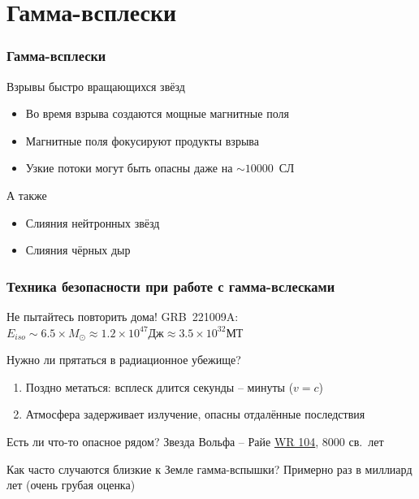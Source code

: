 \documentclass[aspectratio=169]{beamer}
\begin{document}
\section{Гамма-всплески}
\begin{frame}
\frametitle{Гамма-всплески}
\begin{block}{Взрывы быстро вращающихся звёзд}
\begin{itemize}
\item Во время взрыва создаются мощные магнитные поля
\item Магнитные поля фокусируют продукты взрыва
\item Узкие потоки могут быть опасны даже на $\sim 10000$~СЛ
\end{itemize}
\end{block}
\begin{block}{А также}
\begin{itemize}
\item Слияния нейтронных звёзд
\item Слияния чёрных дыр
\end{itemize}
\end{block}
\end{frame}


\begin{frame}
\frametitle{Техника безопасности при работе с гамма-вслесками}
\begin{block}{Не пытайтесь повторить дома!}
 GRB~221009A: $E_{iso} \sim 6.5 \times M_\odot \approx 1.2 \times 10^{47} \mathrm{\text{Дж}} \approx 3.5 \times 10^{32} \mathrm{\text{МТ}}$  \cite{arXiv:2302.13383}
\end{block}

\begin{block}{Нужно ли прятаться в радиационное убежище?}
\begin{enumerate}
\item Поздно метаться: всплеск длится секунды -- минуты ($v = c$)
\item Атмосфера задерживает излучение, опасны отдалённые последствия
\end{enumerate}
\end{block}

\begin{block}{Есть ли что-то опасное рядом?}
Звезда Вольфа -- Райе \href{https://en.wikipedia.org/wiki/WR_104}{WR 104}, 8000 св.~лет
\end{block}

\begin{block}{Как часто случаются близкие к Земле гамма-вспышки?}
Примерно раз в миллиард лет (очень грубая оценка)
\end{block}
\end{frame}
\end{document}
